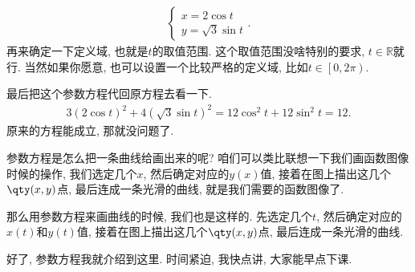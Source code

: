 \documentclass{ctexbook}
\begin{document}
{\begin{align*}
\begin{cases}
x=2\cos{t}\\
y=\sqrt{3}\sin{t}
\end{cases}
.\end{align*}
再来确定一下定义域, 也就是$t$的取值范围. 这个取值范围没啥特别的要求, $t\in\mathbb{R}$就行. 当然如果你愿意, 也可以设置一个比较严格的定义域, 比如$t\in\left[0,2\pi\right)$. \par
最后把这个参数方程代回原方程去看一下. 
\begin{align*}
3(2\cos{t})^{2}+4(\sqrt{3}\sin{t})^{2}=12\cos^{2}{t}+12\sin^{2}{t}=12
.\end{align*}
原来的方程能成立, 那就没问题了. \par
参数方程是怎么把一条曲线给画出来的呢? 咱们可以类比联想一下我们画函数图像时候的操作, 我们选定几个$x$, 然后确定对应的$y(x)$值, 接着在图上描出这几个$\qty(x,y)$点, 最后连成一条光滑的曲线, 就是我们需要的函数图像了. \par
那么用参数方程来画曲线的时候, 我们也是这样的. 先选定几个$t$, 然后确定对应的$x(t)$和$y(t)$值, 接着在图上描出这几个$\qty(x,y)$点, 最后连成一条光滑的曲线. \par
好了, 参数方程我就介绍到这里. 时间紧迫, 我快点讲, 大家能早点下课. \par
}
\end{document}
